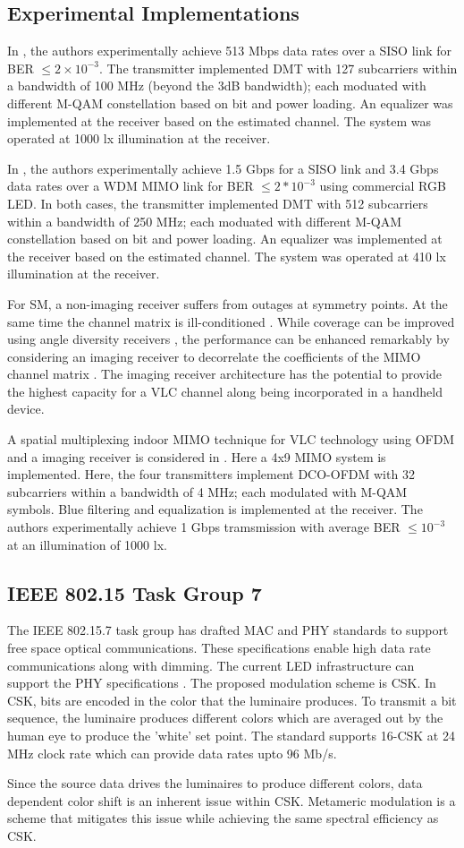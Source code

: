 \subsection{Experimental Implementations}
\label{relatedExperiments}
In \cite{vuc10a}, the authors experimentally achieve 513 Mbps data rates over a SISO link for BER $\leq 2\times10^{-3}$. The transmitter implemented DMT with 127 subcarriers within a bandwidth of 100 MHz (beyond the 3dB bandwidth); each moduated with different M-QAM constellation based on bit and power loading. An equalizer was implemented at the receiver based on the estimated channel. The system was operated at 1000 lx illumination at the receiver.

In \cite{cos12a}, the authors experimentally achieve 1.5 Gbps for a SISO link and 3.4 Gbps data rates over a WDM MIMO link for BER $\leq 2*10^{-3}$ using commercial RGB LED. In both cases, the transmitter implemented DMT with 512 subcarriers within a bandwidth of 250 MHz; each moduated with different M-QAM constellation based on bit and power loading. An equalizer was implemented at the receiver based on the estimated channel. The system was operated at 410 lx illumination at the receiver.

For SM, a non-imaging receiver suffers from outages at symmetry points. At the same time the channel matrix is ill-conditioned \cite{zen09a}.  While coverage can be improved using angle diversity receivers \cite{car00a}, the performance can be enhanced remarkably by considering an imaging receiver to decorrelate the coefficients of the MIMO channel matrix \cite{dja00a}. The imaging receiver architecture \cite{kah98a} has the potential to provide the highest capacity for a VLC channel along being incorporated in a handheld device. 

A spatial multiplexing indoor MIMO technique for VLC technology using OFDM and a imaging receiver is considered in \cite{azh13a}. Here a 4x9 MIMO system is implemented. Here, the four transmitters implement DCO-OFDM with 32 subcarriers within a bandwidth of 4 MHz; each modulated with M-QAM symbols. Blue filtering and equalization is implemented at the receiver. The authors experimentally achieve 1 Gbps tramsmission with average BER $\leq 10^{-3}$ at an illumination of 1000 lx. 

\subsection{IEEE 802.15 Task Group 7}
\label{relatedStandard}
The IEEE 802.15.7 task group has drafted MAC and PHY standards to support free space optical communications. These specifications enable high data rate communications along with dimming. The current LED infrastructure can support the PHY specifications \cite{raj12a}. The proposed modulation scheme is CSK. In CSK, bits are encoded in the color that the luminaire produces. To transmit a bit sequence, the luminaire produces different colors which are averaged out by the human eye to produce the 'white' set point. The standard supports 16-CSK at 24 MHz clock rate which can provide data rates upto 96 Mb/s.

Since the source data drives the luminaires to produce different colors, data dependent color shift is an inherent issue within CSK. Metameric modulation \cite{but12a} is a scheme that mitigates this issue while achieving the same spectral efficiency as CSK.
